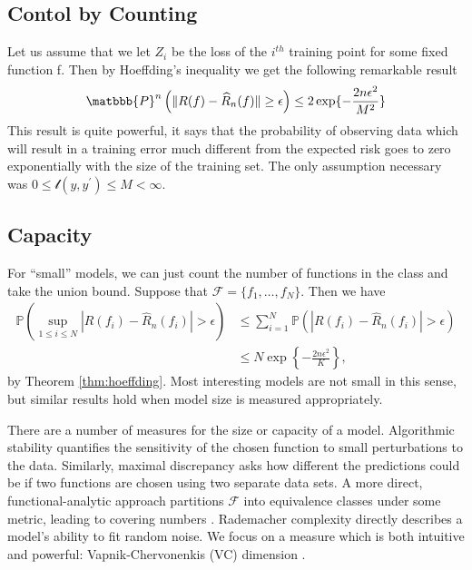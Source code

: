 \documentclass{article}
\theoremstyle{plain}
\newcommand{\F}{\mathcal{F}}
\renewcommand{\P}{\mathbb{P}}
\renewcommand{\hat}[1]{\widehat{#1}}
\begin{document}
\subsection{Contol by Counting}
Let us assume that we let $Z_i$ be the loss of the $i^{th}$ training point for some fixed function f. 
Then by Hoeffding's inequality we get the following remarkable result
\begin{equation}
\matbbb{P}^n\left(\|R(f) - \hat{R}_{n}(f) \| \geq \epsilon \right) \leq 2 \exp\lbrace - \dfrac{2n\epsilon^{2}}{M^2}\rbrace
\end{equation}
This result is quite powerful, it says that the probability of observing data which will result in a training error much different from the expected 
risk goes to zero exponentially with the size of the training set. The only assumption necessary was $0 \leq \mathcal{l}(y,y^{'}) \leq M \lt \infty$.
\subsection{Capacity}
\label{sec:capacity}

For ``small'' models, we can just count the number of functions in the class
and take the union bound. Suppose that $\F = \{f_1,\ldots,f_N\}$. Then we have
\begin{align}
  \P\left( \sup_{1\leq i \leq N} |R(f_i) - \hat{R}_n(f_i)| > \epsilon
  \right)& \leq \sum_{i=1}^N \P\left(  |R(f_i) - \hat{R}_n(f_i)| > \epsilon
  \right) \\ &\leq N\exp\left\{ - \frac{2n\epsilon^2}{K}\right\},
  \label{eq:union-bound}
\end{align}
by Theorem \ref{thm:hoeffding}. Most interesting models are not small in this
sense, but similar results hold when model size is measured
appropriately.

There are a number of measures for the size or capacity of a model.
Algorithmic stability
\citep{KearnsRon1999,BousquetElisseeff2002,BousquetElisseeff2001} quantifies
the sensitivity of the chosen function to small perturbations to the data.
Similarly, maximal discrepancy \citep{Vapnik2000} asks how different the
predictions could be if two functions are chosen using two separate data sets.
A more direct, functional-analytic approach partitions $\F$ into equivalence
classes under some metric, leading to covering numbers
\citep{Pollard1990,Pollard1984}.  Rademacher complexity
\citep{BartlettMendelson2002} directly describes a model's ability to fit
random noise. We focus on a measure which is both intuitive and powerful:
Vapnik-Chervonenkis (VC) dimension \citep{Vapnik1998,Vapnik2000}.
\end{document}
